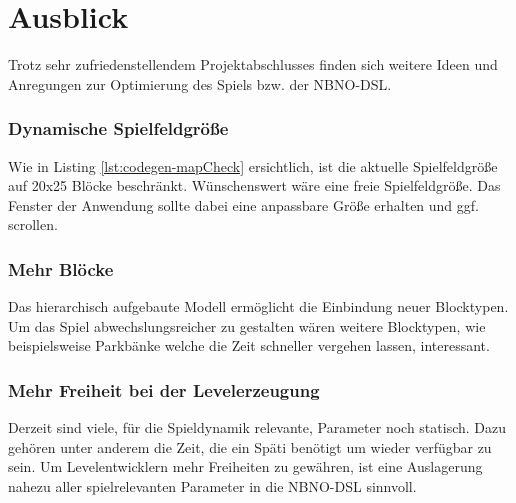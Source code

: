 \section{Ausblick}

Trotz sehr zufriedenstellendem Projektabschlusses finden sich weitere Ideen und Anregungen zur Optimierung des Spiels bzw. der NBNO-DSL.

\subsubsection{Dynamische Spielfeldgröße}
Wie in Listing \ref{lst:codegen-mapCheck} ersichtlich, ist die aktuelle Spielfeldgröße auf 20x25 Blöcke beschränkt.
Wünschenswert wäre eine freie Spielfeldgröße.
Das Fenster der Anwendung sollte dabei eine anpassbare Größe erhalten und ggf. scrollen.

\subsubsection{Mehr Blöcke}
Das hierarchisch aufgebaute Modell ermöglicht die Einbindung neuer Blocktypen.
Um das Spiel abwechslungsreicher zu gestalten wären weitere Blocktypen, wie beispielsweise Parkbänke welche die Zeit schneller vergehen lassen, interessant.

\subsubsection{Mehr Freiheit bei der Levelerzeugung}
Derzeit sind viele, für die Spieldynamik relevante, Parameter noch statisch.
Dazu gehören unter anderem die Zeit, die ein Späti benötigt um wieder verfügbar zu sein.
Um Levelentwicklern mehr Freiheiten zu gewähren, ist eine Auslagerung nahezu aller spielrelevanten Parameter in die NBNO-DSL sinnvoll.